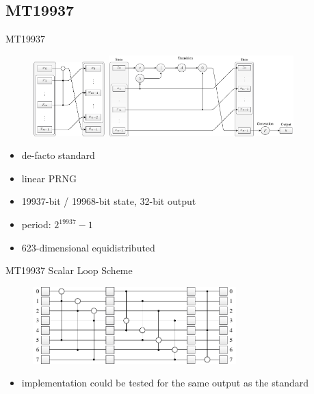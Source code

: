 \documentclass[aspectratio=169]{beamer}
\begin{document}
    \subsection{MT19937}
    \begin{frame}{MT19937}
      \begin{figure}
        \includegraphics[width=0.25\textwidth]{figures/mt19937_transition_short.pdf}
        \hfill
        \includegraphics[width=0.637\textwidth]{figures/mt19937_scheme.pdf}
      \end{figure}
      \begin{minipage}{0.49\textwidth}
        \begin{itemize}
          \item de-facto standard
          \item linear PRNG
          \item 19937-bit / 19968-bit state, 32-bit output
        \end{itemize}
      \end{minipage}
      \hfill
      \begin{minipage}{0.4\textwidth}
        \begin{itemize}
          \item period: $2^{19937}-1$
          \item 623-dimensional equidistributed
        \end{itemize}
      \end{minipage}
    \end{frame}

    \begin{frame}{MT19937 Scalar Loop Scheme}
      \begin{figure}
        \includegraphics[width=0.7\textwidth]{figures/mt19937_loop_scheme.pdf}
      \end{figure}
      \begin{itemize}
        \item implementation could be tested for the same output as the standard
      \end{itemize}
    \end{frame}
\end{document}
